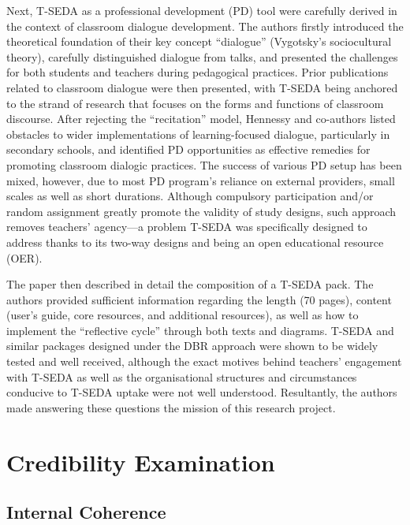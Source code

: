 \documentclass[
        a4paper, %
        12pt, %
        stu, %
        donotrepeattitle, %
        floatsintext, %
        biblatex, %
        twoside, %
        colorlinks=true,        %
        linkcolor=red,          %
        anchorcolor=red,      %
        citecolor=blue,         %
        urlcolor=blue,          %
        bookmarks=true,         %
        bookmarksopen=false,    %
        bookmarksnumbered=true,  %
        dvipsnames
]{apa7}
\begin{document}
Next, T-SEDA as a professional development (PD) tool were carefully derived in the context of classroom dialogue development. The authors firstly introduced the theoretical foundation of their key concept ``dialogue'' (Vygotsky's sociocultural theory), carefully distinguished dialogue from talks, and presented the challenges for both students and teachers during pedagogical practices. Prior publications related to classroom dialogue were then presented, with T-SEDA being anchored to the strand of research that focuses on the forms and functions of classroom discourse. After rejecting the ``recitation'' model, Hennessy and co-authors listed obstacles to wider implementations of learning-focused dialogue, particularly in secondary schools, and identified PD opportunities as effective remedies for promoting classroom dialogic practices. The success of various PD setup has been mixed, however, due to most PD program's reliance on external providers, small scales as well as short durations. Although compulsory participation and/or random assignment greatly promote the validity of study designs, such approach removes teachers' agency---a problem T-SEDA was specifically designed to address thanks to its two-way designs and being an open educational resource (OER).

The paper then described in detail the composition of a T-SEDA pack. The authors provided sufficient information regarding the length (70 pages), content (user's guide, core resources, and additional resources), as well as how to implement the ``reflective cycle'' through both texts and diagrams. T-SEDA and similar packages designed under the DBR approach were shown to be widely tested and well received, although the exact motives behind teachers' engagement with T-SEDA as well as the organisational structures and circumstances conducive to T-SEDA uptake were not well understood. Resultantly, the authors made answering these questions the mission of this research project.

\section{Credibility Examination} %


\subsection{Internal Coherence} %
\end{document}
